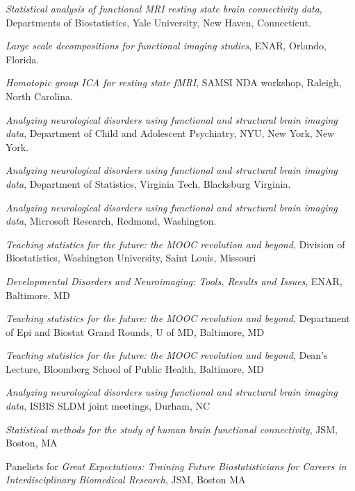 \documentclass[12pt]{article}
\begin{document}
\begin{description}
\begin{description}
\item {\it Statistical analysis of functional MRI resting state brain connectivity data}, Departments of Biostatistics, Yale University, New Haven, Connecticut.
    \end{description}
\item[\textnormal{2013}]
  \begin{description}
  \item {\it Large scale decompositions for functional imaging studies}, ENAR, Orlando, Florida.
    \item {\it Homotopic group ICA for resting state fMRI}, SAMSI NDA workshop, Raleigh, North Carolina.
    \item {\it Analyzing neurological disorders using functional and structural brain imaging data}, Department of Child and Adolescent Psychiatry, NYU, New York, New York.
    \item {\it Analyzing neurological disorders using functional and structural brain imaging data}, Department of Statistics, Virginia Tech, Blacksburg Virginia.
    \item {\it Analyzing neurological disorders using functional and structural brain imaging data}, Microsoft Research, Redmond, Washington.
  \end{description}
\item[\textnormal{2014}]
    \begin{description}
    \item {\it Teaching statistics for the future: the MOOC revolution and beyond}, Division of Biostatistics, Washington University, Saint Louis, Missouri
    \item {\it Developmental Disorders and Neuroimaging: Tools, Results and Issues}, ENAR, Baltimore, MD
    \item {\it Teaching statistics for the future: the MOOC revolution and beyond}, Department of Epi and Biostat Grand Rounds, U of MD, Baltimore, MD
    \item {\it Teaching statistics for the future: the MOOC revolution and beyond}, Dean's Lecture, Bloomberg School of Public Health, Baltimore, MD
    \item {\it Analyzing neurological disorders using functional and structural brain imaging data}, ISBIS SLDM joint meetings, Durham, NC
    \item {\it Statistical methods for the study of human brain functional connectivity}, JSM, Boston, MA
    \item Panelists for {\it Great Expectations: Training Future Biostatisticians for Careers in Interdisciplinary Biomedical Research}, JSM, Boston MA

\end{description}
\end{description}
\end{document}
